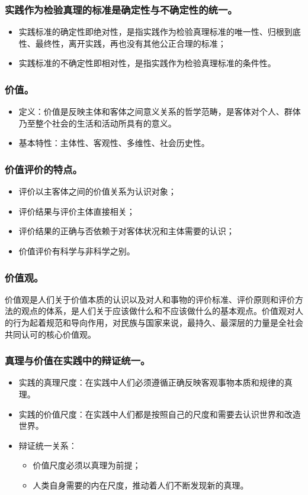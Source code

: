 \documentclass{article}
\begin{document}
\subsubsection{实践作为检验真理的标准是确定性与不确定性的统一。}
\begin{itemize}
    \item 实践标准的确定性即绝对性，是指实践作为检验真理标准的唯一性、归根到底性、最终性，离开实践，再也没有其他公正合理的标准；
    \item 实践标准的不确定性即相对性，是指实践作为检验真理标准的条件性。
\end{itemize}

\subsubsection{价值。}
\begin{itemize}
    \item 定义：价值是反映主体和客体之间意义关系的哲学范畴，是客体对个人、群体乃至整个社会的生活和活动所具有的意义。
    \item 基本特性：主体性、客观性、多维性、社会历史性。
\end{itemize}

\subsubsection{价值评价的特点。}
\begin{itemize}
    \item 评价以主客体之间的价值关系为认识对象；
    \item 评价结果与评价主体直接相关；
    \item 评价结果的正确与否依赖于对客体状况和主体需要的认识；
    \item 价值评价有科学与非科学之别。
\end{itemize}

\subsubsection{价值观。}
价值观是人们关于价值本质的认识以及对人和事物的评价标准、评价原则和评价方法的观点的体系，是人们关于应该做什么和不应该做什么的基本观点。价值观对人的行为起着规范和导向作用，对民族与国家来说，最持久、最深层的力量是全社会共同认可的核心价值观。

\subsubsection{真理与价值在实践中的辩证统一。}
\begin{itemize}
    \item 实践的真理尺度：在实践中人们必须遵循正确反映客观事物本质和规律的真理。
    \item 实践的价值尺度：在实践中人们都是按照自己的尺度和需要去认识世界和改造世界。
    \item 辩证统一关系：
    \begin{itemize}
        \item 价值尺度必须以真理为前提；
        \item 人类自身需要的内在尺度，推动着人们不断发现新的真理。
    \end{itemize}
\end{itemize}
\end{document}
